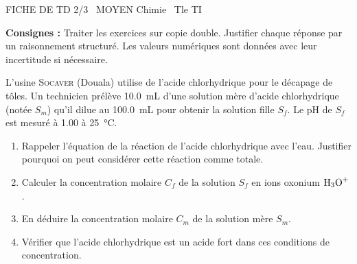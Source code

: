 \documentclass[11pt]{article}
\begin{document}
\begin{tcolorbox}[enhanced,colback=popink,colframe=popink,arc=10pt,boxrule=0pt,left=12pt,right=12pt,top=9pt,bottom=9pt]
{\color{white}\popxbold\small FICHE DE TD 2/3 \textbullet\ MOYEN \hfill Chimie \textbullet\ Tle TI\par}
\end{tcolorbox}
\vspace{4pt}
\noindent \textbf{Consignes :} Traiter les exercices sur copie double. Justifier chaque réponse par un raisonnement structuré. Les valeurs numériques sont données avec leur incertitude si nécessaire.

\begin{exercice}
\label{exo:acide_fort}
L'usine \textsc{Socaver} (Douala) utilise de l'acide chlorhydrique pour le décapage de tôles. Un technicien prélève \SI{10,0}{\milli\liter} d'une solution mère d'acide chlorhydrique (notée $S_m$) qu'il dilue au \SI{100,0}{\milli\liter} pour obtenir la solution fille $S_f$. Le pH de $S_f$ est mesuré à \num{1,00} à \SI{25}{\celsius}.
\begin{enumerate}
    \item Rappeler l'équation de la réaction de l'acide chlorhydrique avec l'eau. Justifier pourquoi on peut considérer cette réaction comme totale.
    \item Calculer la concentration molaire $C_f$ de la solution $S_f$ en ions oxonium $\ce{H3O+}$.
    \item En déduire la concentration molaire $C_m$ de la solution mère $S_m$.
    \item Vérifier que l'acide chlorhydrique est un acide fort dans ces conditions de concentration.
\end{enumerate}
\end{exercice}
\end{document}
